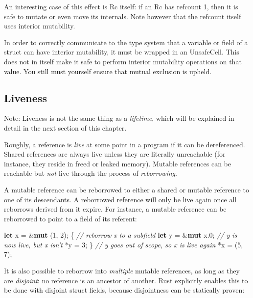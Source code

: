 \documentclass[a4paper,]{book}
\newenvironment{Shaded}{\begin{snugshade}}{\end{snugshade}}
\newcommand{\KeywordTok}[1]{\textcolor[rgb]{0.13,0.29,0.53}{\textbf{{#1}}}}
\newcommand{\DecValTok}[1]{\textcolor[rgb]{0.00,0.00,0.81}{{#1}}}
\newcommand{\CommentTok}[1]{\textcolor[rgb]{0.56,0.35,0.01}{\textit{{#1}}}}
\newcommand{\NormalTok}[1]{{#1}}
\begin{document}
An interesting case of this effect is Rc itself: if an Rc has refcount
1, then it is safe to mutate or even move its internals. Note however
that the refcount itself uses interior mutability.

In order to correctly communicate to the type system that a variable or
field of a struct can have interior mutability, it must be wrapped in an
UnsafeCell. This does not in itself make it safe to perform interior
mutability operations on that value. You still must yourself ensure that
mutual exclusion is upheld.

\subsection{Liveness}\label{liveness}

Note: Liveness is not the same thing as a \emph{lifetime}, which will be
explained in detail in the next section of this chapter.

Roughly, a reference is \emph{live} at some point in a program if it can
be dereferenced. Shared references are always live unless they are
literally unreachable (for instance, they reside in freed or leaked
memory). Mutable references can be reachable but \emph{not} live through
the process of \emph{reborrowing}.

A mutable reference can be reborrowed to either a shared or mutable
reference to one of its descendants. A reborrowed reference will only be
live again once all reborrows derived from it expire. For instance, a
mutable reference can be reborrowed to point to a field of its referent:

\begin{Shaded}
\begin{Highlighting}[]
\KeywordTok{let} \NormalTok{x = &}\KeywordTok{mut} \NormalTok{(}\DecValTok{1}\NormalTok{, }\DecValTok{2}\NormalTok{);}
\NormalTok{\{}
    \CommentTok{// reborrow x to a subfield}
    \KeywordTok{let} \NormalTok{y = &}\KeywordTok{mut} \NormalTok{x.}\DecValTok{0}\NormalTok{;}
    \CommentTok{// y is now live, but x isn't}
    \NormalTok{*y = }\DecValTok{3}\NormalTok{;}
\NormalTok{\}}
\CommentTok{// y goes out of scope, so x is live again}
\NormalTok{*x = (}\DecValTok{5}\NormalTok{, }\DecValTok{7}\NormalTok{);}
\end{Highlighting}
\end{Shaded}

It is also possible to reborrow into \emph{multiple} mutable references,
as long as they are \emph{disjoint}: no reference is an ancestor of
another. Rust explicitly enables this to be done with disjoint struct
fields, because disjointness can be statically proven:
\end{document}
